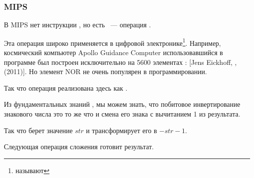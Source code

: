 ﻿\subsubsection{MIPS}



В MIPS нет инструкции \NOT, но есть \NOR~--- операция .

Эта операция широко применяется в цифровой электронике\footnote{\NOR называют }.
Например, космический компьютер Apollo Guidance Computer использовавшийся в программе  был
построен исключительно на 5600 элементах \NOR: 
[Jens Eickhoff, , (2011)].
Но элемент NOR не очень популярен в программировании.

Так что операция \NOT реализована здесь как .

Из фундаментальных знаний , мы можем знать, что побитовое инвертирование знакового
числа это то же что и смена его знака с вычитанием 1 из результата.

Так что \NOT берет значение $str$ и трансформирует его в $-str-1$.

Следующая операция сложения готовит результат.

